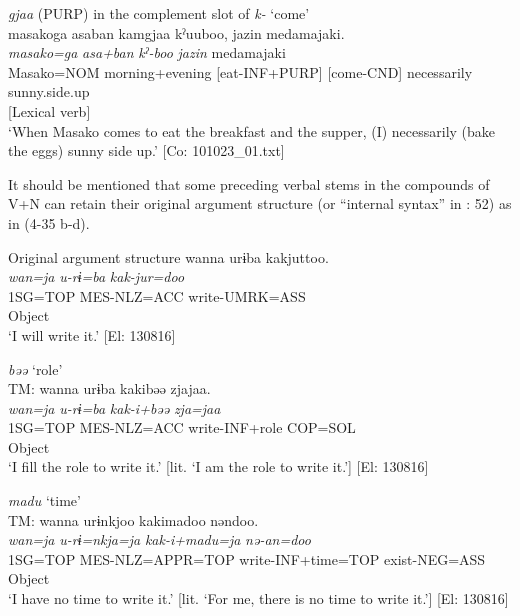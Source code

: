 \ex \textit{gjaa} (PURP) in the complement slot of \textit{k-} ‘come’\\
\gllll masakoga  {\textbar}asaban{\textbar}  kamgjaa  kˀuuboo,  jazin   {\textbar}medamajaki{\textbar}.\\
      \textit{masako=ga}  \textit{asa+ban}  \textit{}  \textit{kˀ-boo}  \textit{jazin} medamajaki\\                                                                                                
      Masako=NOM  morning+evening  [eat-INF+PURP]  [come-CND]  necessarily                       sunny.side.up\\                                                                                                
          [Complement]  [Lexical verb]\\
\glt  ‘When Masako comes to eat the breakfast and the supper, (I) necessarily (bake the eggs) sunny side up.’   [Co: 101023\_01.txt]
\z
\z

It should be mentioned that some preceding verbal stems in the compounds of V+N can retain their original argument structure (or “internal syntax” in \citealt{Haspelmath1996}: 52) as in (4-35 b-d).

\ea  
\ea Original argument structure \label{ex:4.35}
\gllll  wanna  urɨba  kakjuttoo.\\
    \textit{wan=ja}  \textit{u-rɨ=ba}  \textit{kak-jur=doo}\\
    1SG=TOP  MES-NLZ=ACC  write-UMRK=ASS\\
      Object  \\
    \glt     ‘I will write it.’ [El: 130816]

\ex \textit{bəə} ‘role’\\
\gllll  TM:  wanna  urɨba  kakibəə  zjajaa.\\
    \textit{wan=ja}  \textit{u-rɨ=ba}  \textit{kak-i+bəə}  \textit{zja=jaa}\\
    1SG=TOP  MES-NLZ=ACC  write-INF+role  COP=SOL\\
      Object  \\
    \glt     ‘I fill the role to write it.’ [lit. ‘I am the role to write it.’] [El: 130816]

\ex \textit{madu} ‘time’\\
\gllll  TM:  wanna  urɨnkjoo  kakimadoo  nəndoo.\\
    \textit{wan=ja}  \textit{u-rɨ=nkja=ja}  \textit{kak-i+madu=ja}  \textit{nə-an=doo}\\
    1SG=TOP  MES-NLZ=APPR=TOP  write-INF+time=TOP  exist-NEG=ASS\\
      Object    \\
    \glt     ‘I have no time to write it.’ [lit. ‘For me, there is no time to write it.’] [El: 130816]

